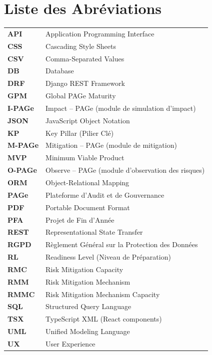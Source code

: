\chapter*{Liste des Abréviations}

\begin{tabular}{@{}ll@{}}
\textbf{API} & Application Programming Interface \\
\textbf{CSS} & Cascading Style Sheets \\
\textbf{CSV} & Comma-Separated Values \\
\textbf{DB} & Database \\
\textbf{DRF} & Django REST Framework \\
\textbf{GPM} & Global PAGe Maturity \\
\textbf{I-PAGe} & Impact -- PAGe (module de simulation d'impact) \\
\textbf{JSON} & JavaScript Object Notation \\
\textbf{KP} & Key Pillar (Pilier Clé) \\
\textbf{M-PAGe} & Mitigation -- PAGe (module de mitigation) \\
\textbf{MVP} & Minimum Viable Product \\
\textbf{O-PAGe} & Observe -- PAGe (module d'observation des risques) \\
\textbf{ORM} & Object-Relational Mapping \\
\textbf{PAGe} & Plateforme d'Audit et de Gouvernance \\
\textbf{PDF} & Portable Document Format \\
\textbf{PFA} & Projet de Fin d'Année \\
\textbf{REST} & Representational State Transfer \\
\textbf{RGPD} & Règlement Général sur la Protection des Données \\
\textbf{RL} & Readiness Level (Niveau de Préparation) \\
\textbf{RMC} & Risk Mitigation Capacity \\
\textbf{RMM} & Risk Mitigation Mechanism \\
\textbf{RMMC} & Risk Mitigation Mechanism Capacity \\
\textbf{SQL} & Structured Query Language \\
\textbf{TSX} & TypeScript XML (React components) \\
\textbf{UML} & Unified Modeling Language \\
\textbf{UX} & User Experience \\
\end{tabular}

